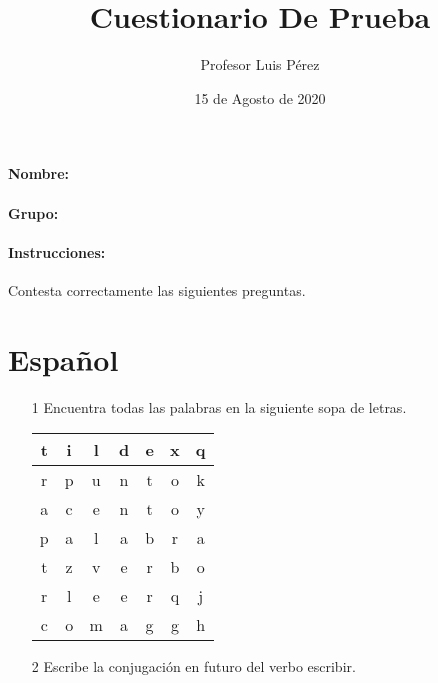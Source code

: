 \documentclass[12pt]{article}
\begin{document}
        \title{Cuestionario De Prueba}
        \author{Profesor Luis Pérez}
        \date{15 de Agosto de 2020}
        \maketitle
        \paragraph{Nombre: }
        \paragraph{Grupo: }
        \paragraph{Instrucciones: }Contesta correctamente las siguientes preguntas.
    \section{Español}
    \begin{itemize}
        \item[1] Encuentra todas las palabras en la siguiente sopa de letras.
        \begin{center}
            \begin{tabular}{|c|c|c|c|c|c|c|}\hline
                t & i & l & d & e & x & q \\ \hline
                r & p & u & n & t & o & k \\ \hline
                a & c & e & n & t & o & y \\ \hline
                p & a & l & a & b & r & a \\ \hline
                t & z & v & e & r & b & o \\ \hline
                r & l & e & e & r & q & j \\ \hline
                c & o & m & a & g & g & h \\ \hline
            \end{tabular}
        \end{center}
        \item[2] Escribe la conjugación en futuro del verbo escribir.
        	\newline
        	\newline
        	\newline
        	\newline
        	\newline
        	\newline
        	\newline
    \end{itemize}
    \newpage
\end{document}
